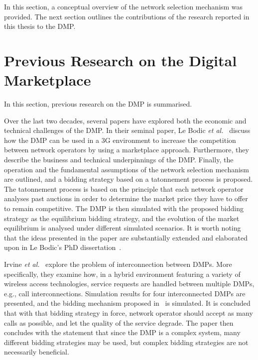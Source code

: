 In this section, a conceptual overview of the network selection mechanism was provided. The next section outlines the contributions of the research reported in this thesis to the DMP.

\section{Previous Research on the Digital Marketplace} %
\label{sec:previous_research_on_the_digital_marketplace_dmp}
In this section, previous research on the DMP is summarised.

Over the last two decades, several papers have explored both the economic and technical challenges of the DMP. In their seminal paper, Le Bodic \emph{et al.}~\cite{DMLeBodic00} discuss how the DMP can be used in a 3G environment to increase the competition between network operators by using a marketplace approach. Furthermore, they describe the business and technical underpinnings of the DMP. Finally, the operation and the fundamental assumptions of the network selection mechanism are outlined, and a bidding strategy based on a tatonnement process is proposed. The tatonnement process is based on the principle that each network operator analyses past auctions in order to determine the market price they have to offer to remain competitive. The DMP is then simulated with the proposed bidding strategy as the equilibrium bidding strategy, and the evolution of the market equilibrium is analysed under different simulated scenarios. It is worth noting that the ideas presented in the paper are substantially extended and elaborated upon in Le Bodic's PhD dissertation~\cite{LeBodicThesis}.

Irvine \emph{et al.}~\cite{DMIrvine01} explore the problem of interconnection between DMPs. More specifically, they examine how, in a hybrid environment featuring a variety of wireless access technologies, service requests are handled between multiple DMPs, e.g., call interconnections. Simulation results for four interconnected DMPs are presented, and the bidding mechanism proposed in~\cite{DMLeBodic00} is simulated. It is concluded that with that bidding strategy in force, network operator should accept as many calls as possible, and let the quality of the service degrade. The paper then concludes with the statement that since the DMP is a complex system, many different bidding strategies may be used, but complex bidding strategies are not necessarily beneficial.

